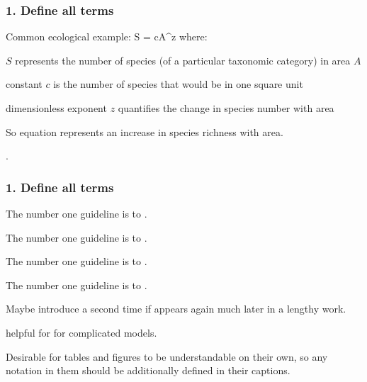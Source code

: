 \begin{frame}
\frametitle{1. Define all terms}
Common ecological example:
\eb
\nonumber S = cA^z
\ee
\pause
where:
\bi
\item $S$ represents the number of species (of a particular taxonomic category)
in area $A$
\item constant $c$ is the
  number of species that would be in one square unit
\item dimensionless exponent $z$ quantifies the change in species number with area
\ei

\pause
So equation represents an increase in species richness with area.

\pause

\medskip

.
\end{frame}


\begin{frame}
\frametitle{1. Define all terms}

The number one guideline is to .

\pause

The number one guideline is to .

\pause

The number one guideline is to .

\pause

The number one guideline is to .

\pause

\medskip

Maybe introduce a second time if appears again much later in a lengthy work.

\medskip

 helpful for for complicated models.

\medskip

\pause

Desirable for tables and figures to be understandable on their own, so any
notation in them should be
additionally defined in their captions.


\end{frame}

